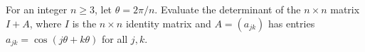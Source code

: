 For an integer $n\geq 3$, let $\theta=2\pi/n$.  Evaluate the determinant of the
$n\times n$ matrix $I+A$, where $I$ is the $n\times n$ identity matrix and
$A=(a_{jk})$ has entries $a_{jk}=\cos(j\theta+k\theta)$ for all $j,k$.
